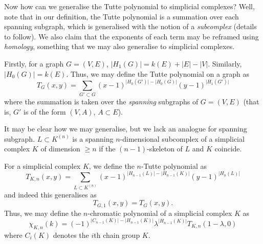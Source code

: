 Now how can we generalise the Tutte polynomial to simplicial complexes? Well, note that in our definition, the Tutte polynomial is a summation over each spanning subgraph, which is generalised with the notion of a \emph{subcomplex} (details to follow). We also claim that the exponents of each term may be reframed using \emph{homology}, something that we may also generalise to simplicial complexes. 

Firstly, for a graph $G = (V, E)$, $\lvert H_1(G) \rvert = k(E) + \lvert E \rvert - \lvert V \rvert$. Similarly, $\lvert H_0(G) \rvert = k(E)$. Thus, we may define the Tutte polynomial on a graph as
\[
  T_G(x,y) = \sum_{G' \subset G} (x-1)^{\lvert H_0(G') \rvert - \lvert H_0(G) \rvert} (y-1)^{\lvert H_1(G') \rvert}
\]
where the summation is taken over the \emph{spanning} subgraphs of $G = (V,E)$ (that is, $G'$ is of the form $(V, A)$, $A \subset E$).

It may be clear how we may generalise, but we lack an analogue for spanning subgraph. $L \subset K^{(n)}$ is a spanning $n$-dimensional subcomplex of a simplicial complex $K$ of dimension $\geq n$ if the $(n-1)$-skeleton of $L$ and $K$ coincide. 

For a simplicial complex $K$, we define the $n$-Tutte polynomial as
\[ 
  T_{K, n}(x,y) = \sum_{L \subset K^{(n)}} (x-1)^{\lvert H_{n-1}(L) \rvert - \lvert H_{n-1}(K) \rvert} (y-1)^{\lvert H_n(L) \rvert}
\]
and indeed this generalises as
\[
  T_{G,1}(x,y) = T_G(x,y).
\]
Thus, we may define the $n$-chromatic polynomial of a simplicial complex $K$ as
\[
  \chi_{K, n}(k) = (-1)^{\lvert C_{n-1}(K) \rvert - \lvert H_{n-1}(K) \rvert}
    \lambda^{\lvert H_{n-1}(K) \rvert} T_{K, n}(1 - \lambda, 0)
\]
where $C_{i}(K)$ denotes the $i$th chain group $K$.